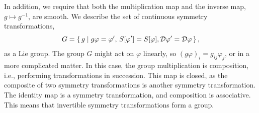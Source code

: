 In addition, we require that both the multiplication map and the inverse map, $g \mapsto g^{-1}$, are smooth.
We describe the set of continuous symmetry transformations, 
\begin{equation}
    G = \left\{\, g \mid g \varphi = \varphi', \, S[\varphi'] = S[\varphi], \mathcal{D} \varphi' = \mathcal{D} \varphi  \,\right\},
\end{equation}
%
as a Lie group.
The group $G$ might act on $\varphi$ linearly, so $(g\varphi)_i = g_{ij}\varphi_j$, or in a more complicated matter.
In this case, the group multiplication is composition, i.e., performing transformations in succession.
This map is closed, as the composite of two symmetry transformations is another symmetry transformation.
The identity map is a symmetry transformation, and composition is associative.
This means that invertible symmetry transformations form a group.

